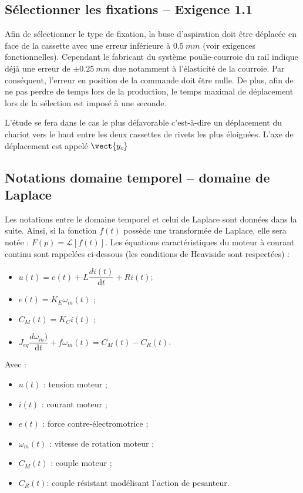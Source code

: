 \begin{multicols}{2}
\fi




\section*{Sélectionner les fixations – Exigence 1.1}
\ifprof
\else 
Afin de sélectionner le type de fixation, la buse d'aspiration doit être déplacée en face de la cassette avec une erreur inférieure à $\SI{0,5}{mm}$ (voir exigences fonctionnelles). Cependant le fabricant du système poulie-courroie du rail indique déjà une erreur de $\pm \SI{0,25}{mm}$ due notamment à l'élasticité de la courroie. Par conséquent, l'erreur en position de la commande doit être nulle. De plus, afin de ne pas perdre de temps lors de la production, le temps maximal de déplacement lors de la sélection est imposé à une seconde.

L'étude se fera dans le cas le plus défavorable c'est-à-dire un déplacement du chariot vers le haut entre les deux cassettes de rivets les plus éloignées. L'axe de déplacement est appelé $\vect{y_c}$
\subsection*{Notations domaine temporel – domaine de Laplace}

Les notations entre le domaine temporel et celui de Laplace sont données dans la suite. Ainsi, si la fonction $f(t)$ possède une transformée de Laplace, elle sera notée : $F(p) = \mathcal{L}[f(t)]$.
Les équations caractéristiques du moteur à courant continu sont rappelées ci-dessous (les conditions de Heaviside sont respectées) :
\begin{itemize}[label=,font=\color{bleuxp}] 
\item $u(t)=e(t)+L \dfrac{di(t)}{\text{d} t}+Ri(t)$;
\item $e(t)=K_E \omega_m (t)$ ;
\item $C_M (t)=K_C i(t)$ ;
\item $J_{eq}  \dfrac{d\omega_m)}{\text{d} t}+f\omega_m (t)=C_M (t)-C_R (t)$.
\end{itemize}

Avec : 
\begin{itemize}[label=,font=\color{bleuxp}] 
\item $u(t)$ : tension moteur ;
\item $i(t)$ : courant moteur ; 
\item $e(t)$ : force contre-électromotrice ;
\item $\omega_m(t)$ : vitesse de rotation moteur ;
\item $C_M (t)$ : couple moteur ;
\item $C_R (t)$: couple résistant modélisant l'action de pesanteur.
\end{itemize}
\fi


\end{multicols}
